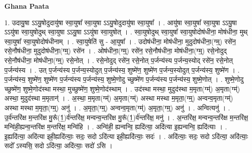 \documentclass[17pt]{extarticle}
\begin{document}
\textbf{Ghana Paata } \newline

1. उदायु॒षा ऽऽयु॒षोदुदायु॑षा स्वा॒युषा᳚ स्वा॒युषा ऽऽयु॒षोदुदायु॑षा स्वा॒युषा᳚ । . आयु॑षा स्वा॒युषा᳚ स्वा॒युषा ऽऽयु॒षा ऽऽयु॑षा स्वा॒युषोदुथ् स्वा॒युषा ऽऽयु॒षा ऽऽयु॑षा स्वा॒युषोत् । . स्वा॒युषोदुथ् स्वा॒युषा᳚ स्वा॒युषोदोष॑धीना॒ मोष॑धीना॒ मुथ् स्वा॒युषा᳚ स्वा॒युषोदोष॑धीनाम् । . स्वा॒युषेति॑ सु - आ॒युषा᳚ । . उदोष॑धीना॒ मोष॑धीना॒ मुदुदोष॑धीना॒(ग्म्॒) रसे॑न॒ रसे॒नौष॑धीना॒ मुदुदोष॑धीना॒(ग्म्॒) रसे॑न । . ओष॑धीना॒(ग्म्॒) रसे॑न॒ रसे॒नौष॑धीना॒ मोष॑धीना॒(ग्म्॒) रसे॒नोदुद् रसे॒नौष॑धीना॒ मोष॑धीना॒(ग्म्॒) रसे॒नोत् । . रसे॒नोदुद् रसे॑न॒ रसे॒नोत् प॒र्जन्य॑स्य प॒र्जन्य॒स्योद् रसे॑न॒ रसे॒नोत् प॒र्जन्य॑स्य । . उत् प॒र्जन्य॑स्य प॒र्जन्य॒स्योदुत् प॒र्जन्य॑स्य॒ शुष्मे॑ण॒ शुष्मे॑ण प॒र्जन्य॒स्योदुत् प॒र्जन्य॑स्य॒ शुष्मे॑ण । . प॒र्जन्य॑स्य॒ शुष्मे॑ण॒ शुष्मे॑ण प॒र्जन्य॑स्य प॒र्जन्य॑स्य॒ शुष्मे॒णोदु च्छुष्मे॑ण प॒र्जन्य॑स्य प॒र्जन्य॑स्य॒ शुष्मे॒णोत् । . शुष्मे॒णोदु च्छुष्मे॑ण॒ शुष्मे॒णोद॑स्था मस्था॒ मुच्छुष्मे॑ण॒ शुष्मे॒णोद॑स्थाम् । . उद॑स्था मस्था॒ मुदुद॑स्था म॒मृता(ग्म्॑) अ॒मृता(ग्म्॑) अस्था॒ मुदुद॑स्था म॒मृतान्॑ । . अ॒स्था॒ म॒मृता(ग्म्॑) अ॒मृता(ग्म्॑) अस्था मस्था म॒मृता॒(ग्म्॒) अन्वन्व॒मृता(ग्म्॑) अस्था मस्था म॒मृता॒(ग्म्॒) अनु॑ । . अ॒मृता॒(ग्म्॒) अन्वन्व॒मृता(ग्म्॑) अ॒मृता॒(ग्म्॒) अनु॑ । . अन्वित्यनु॑ । . उ॒र्व॑न्तरि॑क्ष म॒न्तरि॑क्ष मु॒रू᳚(1॒)र्व॑न्तरि॑क्ष॒ मन्वन्व॒न्तरि॑क्ष मु॒रू᳚(1॒)र्व॑न्तरि॑क्ष॒ मनु॑ । . अ॒न्तरि॑क्ष॒ मन्वन्व॒न्तरि॑क्ष म॒न्तरि॑क्ष॒ मन्वि॑ही॒ह्यन्व॒न्तरि॑क्ष म॒न्तरि॑क्ष॒ मन्वि॑हि । . अन्वि॑ही॒ ह्यन्वन्वि॒ ह्यदि॑त्या॒ अदि॑त्या इ॒ह्यन्वन्वि॒ ह्यदि॑त्याः । . इ॒ह्यदि॑त्या॒ अदि॑त्या इही॒ह्यदि॑त्याः॒ सदः॒ सदो ऽदि॑त्या इही॒ह्यदि॑त्याः॒ सदः॑ । . अदि॑त्याः॒ सदः॒ सदो ऽदि॑त्या॒ अदि॑त्याः॒ सदो᳚ ऽस्यसि॒ सदो ऽदि॑त्या॒ अदि॑त्याः॒ सदो॑ ऽसि । \newline
\end{document}
